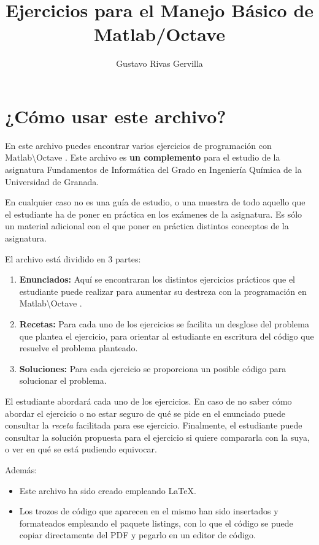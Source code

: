 \documentclass[]{article}
\title{Ejercicios para el Manejo Básico de Matlab/Octave}
\author{Gustavo Rivas Gervilla}
\newcommand{\mt}{Matlab\textbackslash Octave }
\begin{document}
\maketitle

\newpage
\section*{¿Cómo usar este archivo?}

En este archivo puedes encontrar varios ejercicios de programación con \mt. Este archivo es \textbf{un complemento} para el estudio de la asignatura Fundamentos de Informática del Grado en Ingeniería Química de la Universidad de Granada.

En cualquier caso no es una guía de estudio, o una muestra de todo aquello que el estudiante ha de poner en práctica en los exámenes de la asignatura. Es sólo un material adicional con el que poner en práctica distintos conceptos de la asignatura.

El archivo está dividido en 3 partes:
\begin{enumerate}
\item \textbf{Enunciados:} Aquí se encontraran los distintos ejercicios prácticos que el estudiante puede realizar para aumentar su destreza con la programación en \mt.
\item \textbf{Recetas:} Para cada uno de los ejercicios se facilita un desglose del problema que plantea el ejercicio, para orientar al estudiante en escritura del código que resuelve el problema planteado.
\item \textbf{Soluciones:} Para cada ejercicio se proporciona un posible código para solucionar el problema.
\end{enumerate}

El estudiante abordará cada uno de los ejercicios. En caso de no saber cómo abordar el ejercicio o no estar seguro de qué se pide en el enunciado puede consultar la \textit{receta} facilitada para ese ejercicio. Finalmente, el estudiante puede consultar la solución propuesta para el ejercicio si quiere compararla con la suya, o ver en qué se está pudiendo equivocar.

Además:

\begin{itemize}
\item Este archivo ha sido creado empleando \LaTeX.
\item Los trozos de código que aparecen en el mismo han sido insertados y formateados empleando el paquete listings, con lo que el código se puede copiar directamente del PDF y pegarlo en un editor de código.
\end{itemize}
\end{document}
